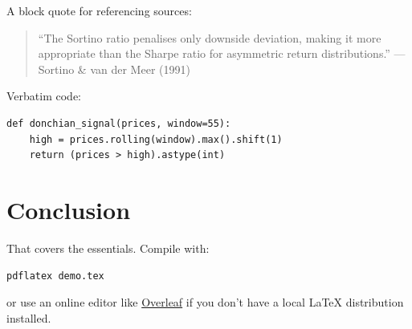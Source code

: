 \documentclass[12pt, a4paper]{article}
\begin{document}
A block quote for referencing sources:

\begin{quote}
    ``The Sortino ratio penalises only downside deviation, making it more
    appropriate than the Sharpe ratio for asymmetric return distributions.''
    \hfill --- Sortino \& van der Meer (1991)
\end{quote}

Verbatim code:

\begin{verbatim}
def donchian_signal(prices, window=55):
    high = prices.rolling(window).max().shift(1)
    return (prices > high).astype(int)
\end{verbatim}

\section{Conclusion}

That covers the essentials. Compile with:
\begin{center}
    \texttt{pdflatex demo.tex}
\end{center}
or use an online editor like \href{https://www.overleaf.com}{Overleaf} if you
don't have a local \LaTeX{} distribution installed.
\end{document}
